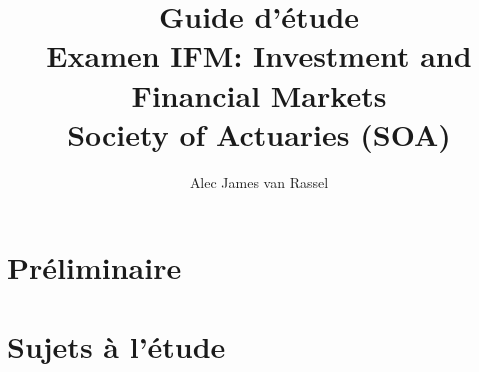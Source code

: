 \documentclass[12pt, titlepage, french]{report}
\title{
	Guide d'étude	\\
	\large Examen IFM: Investment and Financial Markets\\
	Society of Actuaries (SOA)}
\date{}
\author{Alec James van Rassel}
\begin{document}
\maketitle

\tableofcontents

\clearpage

\part*{Préliminaire}



\part*{Sujets à l'étude}



\newpage



\newpage



\newpage



\newpage



\newpage



\newpage



\newpage



\newpage



\newpage



\newpage
\end{document}

